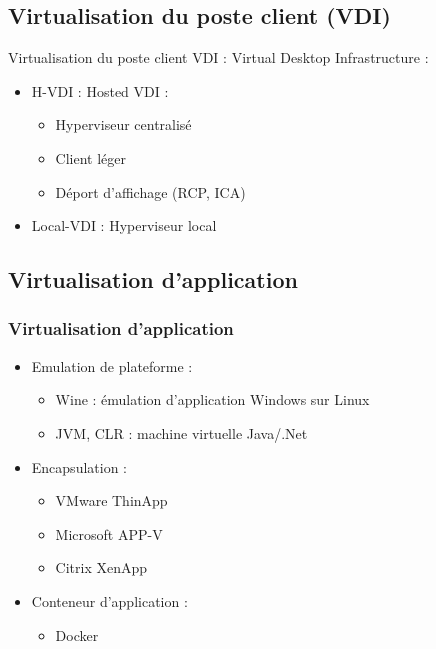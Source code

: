 \subsection{Virtualisation du poste client (VDI)}

\begin{frame}{Virtualisation du poste client}
VDI : Virtual Desktop Infrastructure :
\begin{itemize}
\item H-VDI : Hosted VDI :
\begin{itemize}
\item Hyperviseur centralisé
\item Client léger
\item Déport d'affichage (RCP, ICA)
\end{itemize}

\item Local-VDI : Hyperviseur local
\end{itemize}
\end{frame}

\subsection{Virtualisation d'application}

\begin{frame}
\frametitle{Virtualisation d'application}
\begin{itemize}
\item Emulation de plateforme : 
\begin{itemize}
\item Wine : émulation d'application Windows sur Linux
\item JVM, CLR : machine virtuelle Java/.Net
\end{itemize}
\item Encapsulation :
\begin{itemize}
\item  VMware ThinApp
\item Microsoft APP-V
\item Citrix XenApp
\end{itemize}
\item Conteneur d'application :
\begin{itemize}
\item Docker
\end{itemize}

\end{itemize}
\end{frame}

